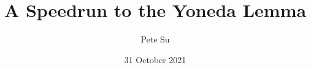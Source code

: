 \documentclass[12pt]{article}
\begin{document}
\title{\Large A Speedrun to the Yoneda Lemma}
\author{\large Pete Su}
\date{\large 31 October 2021}

\maketitle


\end{document}
